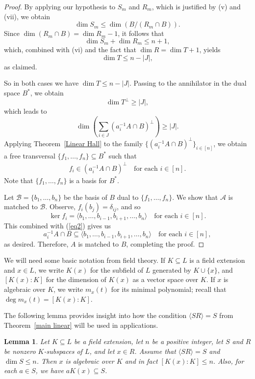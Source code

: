\documentclass[11pt]{amsart}
\newtheorem{lemma}[theorem]{Lemma}
\theoremstyle{definition}
\theoremstyle{remark}
\begin{document}
\begin{proof}
By applying our hypothesis to \( S_m \) and \( R_m \), which is justified by (v) and (vii), we obtain
\[
\dim S_m \leq \dim (B/(R_m \cap B)).
\]
Since \( \dim (R_m \cap B) = \dim R_m - 1 \), it follows that 
\[
\dim S_m + \dim R_m \leq n + 1,
\]
which, combined with (vi) and the fact that \( \dim R = \dim T + 1 \), yields
\[
\dim T \leq n - |J|,
\]
as claimed.

\smallskip

So in both cases we have \( \dim T \leq n - |J| \). Passing to the annihilator in the dual space \( B^* \), we obtain
\[
\dim T^\perp \geq |J|,
\]
which leads to
\[
\dim \left( \sum_{i \in J} (a_i^{-1} A \cap B)^\perp \right) \geq |J|.
\]
Applying Theorem~\ref{Linear Hall} to the family \( \{(a_i^{-1} A \cap B)^\perp\}_{i \in [n]} \), we obtain a free transversal \( \{f_1, \ldots, f_n \}  \subseteq B^* \) such that 
\begin{align}\label{eq2}
f_i \in (a_i^{-1} A \cap B)^\perp  \quad \text{for each }i \in [n].
\end{align}
Note that \( \{f_1, \ldots, f_n\} \) is a basis for \( B^* \).

Let \( \mathcal{B} = \{b_1, \ldots, b_n\} \) be the basis of \( B \) dual to \( \{f_1, \ldots, f_n\} \).  We show that \( \mathcal{A} \) is matched to \( \mathcal{B} \). Observe, \( f_i(b_j) = \delta_{ij} \), and so
\[
\ker f_i = \langle b_1, \ldots, b_{i-1}, b_{i+1}, \ldots, b_n \rangle \quad \text{for each }i \in [n].  
\]
This combined with (\ref{eq2}) gives us 
\[
a_i^{-1} A \cap B \subseteq \langle b_1, \ldots, b_{i-1}, b_{i+1}, \ldots, b_n \rangle \quad \text{for each } i \in [n],
\]
as desired. Therefore, \( A \) is matched to \( B \), completing the proof.
\end{proof}


We will need some basic notation from field theory. If \( K \subseteq L \) is a field extension and \( x \in L \), we write \( K(x) \) for the subfield of \( L \) generated by \( K \cup \{ x \} \), and \( [K(x) : K ] \) for the dimension of \( K(x) \) as a vector space over \( K \). If \( x \) is algebraic over \( K \), we write \( m_x(t) \) for its minimal polynomial; recall that \( \deg m_x(t) = [K(x) : K ] \).

The following lemma provides insight into how the condition \( \langle SR \rangle = S \) from Theorem~\ref{main linear} will be used in applications.


\begin{lemma} \label{Linear Lemma}
Let \( K \subseteq L \) be a field extension, let \( n \) be a positive integer, let \( S \) and \( R \) be nonzero \( K \)-subspaces of \( L \), and let \( x \in R \).  Assume that \( \langle SR \rangle = S \) and  \( \dim S \leq n \). Then \( x \) is algebraic over \( K \) and in fact \( [K(x): K] \leq n \). Also, for each \( a \in S \), we have \( aK(x) \subseteq S \).  
\end{lemma}
\end{document}
